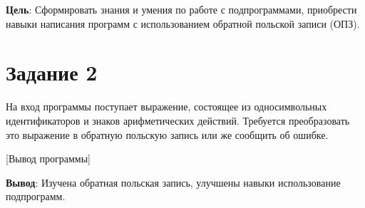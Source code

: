 \documentclass{bsuir}
\begin{document}

\textbf{Цель}: Сформировать знания и умения по работе с подпрограммами,
приобрести навыки написания программ с использованием обратной польской записи
(ОПЗ).

\section*{Задание 2}

На вход программы поступает выражение, состоящее из односимвольных
идентификаторов и знаков арифметических действий. Требуется преобразовать это
выражение в обратную польскую запись или же сообщить об ошибке.


[Вывод программы]

\textbf{Вывод}: Изучена обратная польская запись, улучшены навыки использование
подпрограмм.
\end{document}
